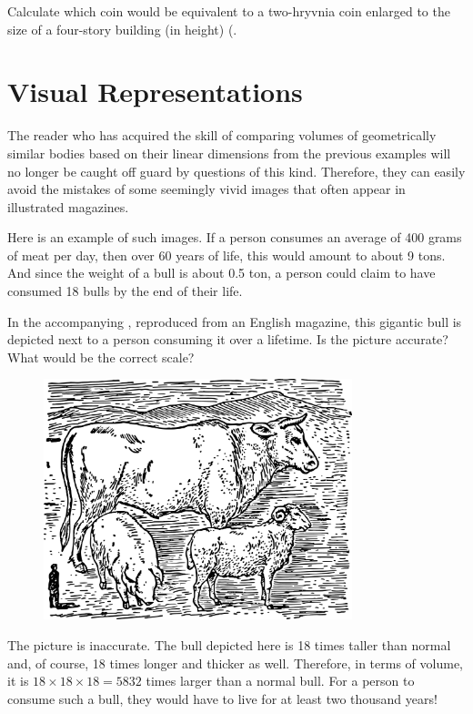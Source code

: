 \ques Calculate which coin would be equivalent to a two-hryvnia coin enlarged to the size of a four-story building (in height) (.

\section{Visual Representations}
\label{sec-11.12}



The reader who has acquired the skill of comparing volumes of geometrically similar bodies based on their linear dimensions from the previous examples will no longer be caught off guard by questions of this kind. Therefore, they can easily avoid the mistakes of some seemingly vivid images that often appear in illustrated magazines.


\ques Here is an example of such images. If a person consumes an average of 400 grams of meat per day, then over 60 years of life, this would amount to about 9 tons. And since the weight of a bull is about 0.5 ton, a person could claim to have consumed 18 bulls by the end of their life.

In the accompanying , reproduced from an English magazine, this gigantic bull is depicted next to a person consuming it over a lifetime. Is the picture accurate? What would be the correct scale?

\begin{figure}[h!]
\centering
\includegraphics[width=0.8\textwidth]{figures/ch-11/fig-170.pdf}
\end{figure}


\ans The picture is inaccurate. The bull depicted here is 18 times taller than normal and, of course, 18 times longer and thicker as well. Therefore, in terms of volume, it is $18 \times 18 \times 18 = 5832$ times larger than a normal bull. For a person to consume such a bull, they would have to live for at least two thousand years!

